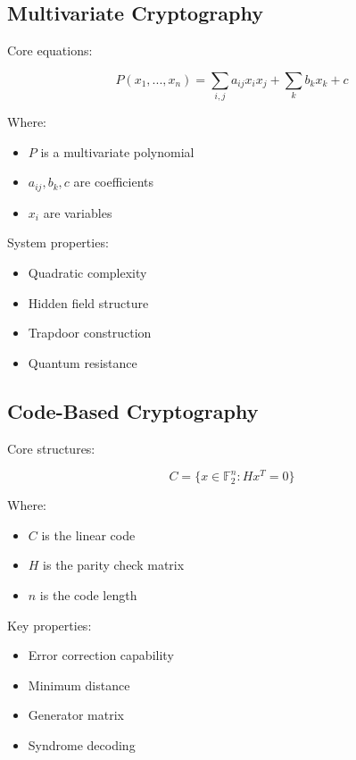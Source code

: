 \documentclass[12pt]{article}
\begin{document}
\subsection{Multivariate Cryptography}

Core equations:

\begin{equation}
P(x_1,...,x_n) = \sum_{i,j} a_{ij}x_ix_j + \sum_k b_kx_k + c
\end{equation}

Where:
\begin{itemize}
\item $P$ is a multivariate polynomial
\item $a_{ij}, b_k, c$ are coefficients
\item $x_i$ are variables
\end{itemize}

System properties:
\begin{itemize}
\item Quadratic complexity
\item Hidden field structure
\item Trapdoor construction
\item Quantum resistance
\end{itemize}

\subsection{Code-Based Cryptography}

Core structures:

\begin{equation}
C = \{x \in \mathbb{F}_2^n : Hx^T = 0\}
\end{equation}

Where:
\begin{itemize}
\item $C$ is the linear code
\item $H$ is the parity check matrix
\item $n$ is the code length
\end{itemize}

Key properties:
\begin{itemize}
\item Error correction capability
\item Minimum distance
\item Generator matrix
\item Syndrome decoding
\end{itemize}
\end{document}
